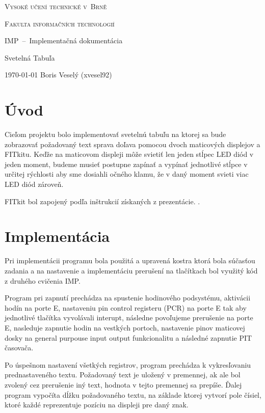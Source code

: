 \documentclass[a4paper, 11pt]{article}
\begin{document}
    \begin{titlepage}
        \begin{center}
            \Huge
            \textsc{Vysoké učení technické v~Brně}
            \huge

            \textsc{ Fakulta informačních technologií}

            \LARGE IMP \,--\, Implementačná dokumentácia 
            
            \Huge Svetelná Tabuľa

        \end{center}
        {\Large \today \hfill
        Boris Veselý (xvesel92)}
    \end{titlepage}

    \tableofcontents
    \newpage
    \section{Úvod}
        Cieľom projektu bolo implementovať svetelnú tabuľu na ktorej sa bude zobrazovať požadovaný text sprava doľava pomocou dvoch maticových displejov a FITkitu. Keďže na maticovom displeji môže svietiť len jeden stĺpec LED diód v jeden moment, budeme musieť postupne zapínať a vypínať jednotlivé stĺpce v určitej rýchlosti aby sme dosiahli očného klamu, že v daný moment svieti viac LED diód zároveň. 
    
        FITkit bol zapojený podľa inštrukcií získaných z prezentácie. \cite{Simek2022}.

    \section{Implementácia}
        Pri implementácii programu bola použitá a upravená kostra ktorá bola súčasťou zadania \cite{SimekKod2022} a na nastavenie a implementáciu prerušení na tlačítkach bol využitý kód z druhého cvičenia IMP.

        Program pri zapnutí prechádza na spustenie hodinového podsystému, aktivácii hodín na porte E, nastaveniu pin control registeru (PCR) na porte E tak aby jednotlivé tlačítka vyvolávali interupt, následne povoľujeme prerušenie na porte E, nasleduje zapnutie hodin na vestkých portoch, nastavenie pinov maticovej dosky na general purpouse input output funkcionalitu a následné zapnutie PIT časovača. 

        Po úspešnom nastavení všetkých registrov, program prechádza k vykresľovaniu prednastaveného textu. Požadovaný text je uložený v premennej, ak ale bol zvolený cez prerušenie iný text, hodnota v tejto premennej sa prepíše. Ďalej program vypočíta dĺžku požadovaného textu, na základe ktorej vytvorí pole čísiel, ktoré každé reprezentuje pozíciu na displeji pre daný znak.
\end{document}
